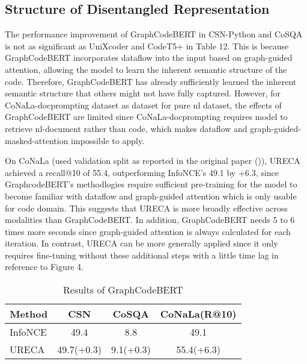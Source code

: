 \subsection{Structure of Disentangled Representation}
The performance improvement of GraphCodeBERT in CSN-Python and CoSQA is not as significant 
as UniXcoder and CodeT5+ in Table 12.
This is because GraphCodeBERT incorporates dataflow into the input based on graph-guided attention,
allowing the model to learn the inherent semantic structure of the code.
Therefore, GraphCodeBERT has already sufficiently learned the inherent semantic structure
that others might not have fully captured.
However, for CoNaLa-docprompting dataset as dataset for pure nl dataset, the effects of GraphCodeBERT 
are limited since CoNaLa-docprompting requires model to retrieve nl-document rather than code, 
which makes dataflow and graph-guided-masked-attention impossible to apply. 

On CoNaLa (used validation split as reported in the original paper (\cite{PengchenBEBG18})), 
URECA achieved a recall@10 of 55.4, outperforming InfoNCE’s 49.1 by +6.3, 
since GraphcodeBERT's methodlogies require sufficient pre-training for the model to become familiar with dataflow and graph-guided attention
which is only usable for code domain. 
This suggests that URECA is more broadly effective across modalities than GraphCodeBERT.
In addition, GraphCodeBERT needs 5 to 6 times more seconds since graph-guided attention is always calculated 
for each iteration.
In contrast, URECA can be more generally applied since it only requires fine-tuning 
without these additional steps with a little time lag in reference to Figure 4.



\begin{table}[h]
\centering
\def\arraystretch{0.8}
\setlength\tabcolsep{8pt} %
\begin{tabular}{@{}lccc@{}}

\toprule
\multicolumn{1}{l}{Method}              & \multicolumn{1}{c}{CSN}           
& \multicolumn{1}{c}{CoSQA}          & \multicolumn{1}{c}{CoNaLa(R@10)}                \\ \midrule

     
InfoNCE                     & \multicolumn{1}{c}{49.4}          & \multicolumn{1}{c}{8.8}          
                            & \multicolumn{1}{c}{49.1}                          
                            \\ \midrule 
URECA                       & \multicolumn{1}{c}{49.7(+0.3)}          & \multicolumn{1}{c}{9.1(+0.3)}          
                            & \multicolumn{1}{c}{55.4(+6.3)}                             
                            \\ \bottomrule 
\end{tabular}
\caption{Results of GraphCodeBERT}
\label{overall}
\end{table}


